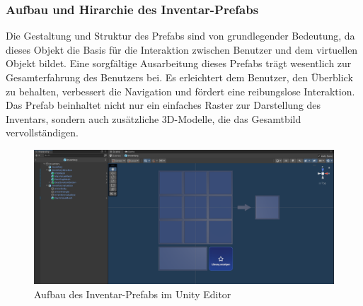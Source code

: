 \subsubsection{Aufbau und Hirarchie des Inventar-Prefabs}
Die Gestaltung und Struktur des Prefabs sind von grundlegender Bedeutung, da dieses Objekt die Basis für die Interaktion
zwischen Benutzer und dem virtuellen Objekt bildet. Eine sorgfältige Ausarbeitung dieses Prefabs trägt wesentlich zur
Gesamterfahrung des Benutzers bei. Es erleichtert dem Benutzer, den Überblick zu behalten, verbessert die Navigation und
fördert eine reibungslose Interaktion. Das Prefab beinhaltet nicht nur ein einfaches Raster zur Darstellung des Inventars,
sondern auch zusätzliche 3D-Modelle, die das Gesamtbild vervollständigen.

\begin{figure}[H]
    \centering
    \includegraphics[scale=0.3]{images/invPrefabUnity}
    \caption{Aufbau des Inventar-Prefabs im Unity Editor}
    \label{fig:invPrefab_UNITY}
\end{figure}

